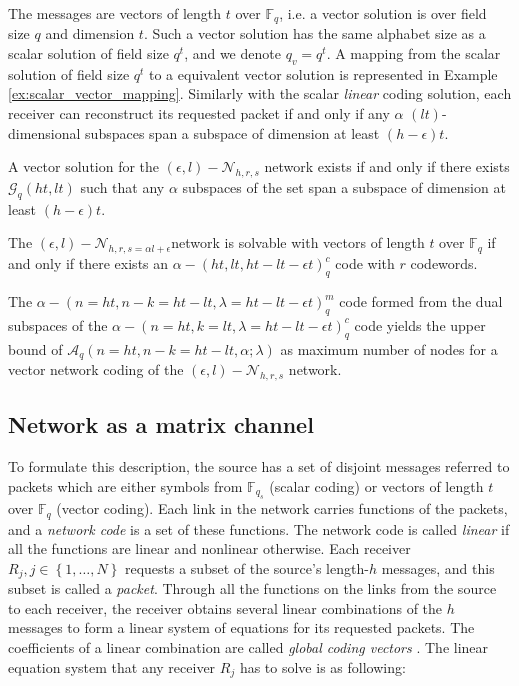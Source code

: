 The messages are vectors of length $t$ over $\ensuremath{\mathbb{F}}_{q}$,
i.e. a vector solution is over field size $q$ and dimension $t$.
Such a vector solution has the same alphabet size as a scalar solution
of field size $q^{t}$, and we denote $q_{v}=q^{t}$. A mapping from
the scalar solution of field size $q^{t}$ to a equivalent vector
solution is represented in Example \ref{ex:scalar_vector_mapping}.
Similarly with the scalar \textit{linear} coding solution, each receiver
can reconstruct its requested packet if and only if any $\alpha$
$\left(lt\right)$-dimensional subspaces span a subspace of dimension
at least $\left(h-\epsilon\right)t$.
\begin{thm}
A vector solution for the $(\epsilon,l)-\mathcal{N}_{h,r,s}$ network
exists if and only if there exists $\mathcal{G}_{q}\left(ht,lt\right)$
such that any $\alpha$ subspaces of the set span a subspace of dimension
at least $\left(h-\epsilon\right)t$. \cite{Zhang:2019}
\end{thm}
%
\begin{thm}
The $(\epsilon,l)-\mathcal{N}_{h,r,s=\alpha l+\epsilon}$network is
solvable with vectors of length $t$ over $\ensuremath{\mathbb{F}}_{q}$
if and only if there exists an $\alpha-\left(ht,lt,ht-lt-\epsilon t\right)_{q}^{c}$
code with $r$ codewords. \cite{Zhang:2019}
\end{thm}
\begin{cor}
The $\alpha-\left(n=ht,n-k=ht-lt,\lambda=ht-lt-\epsilon t\right)_{q}^{m}$
code formed from the dual subspaces of the $\alpha-\left(n=ht,k=lt,\lambda=ht-lt-\epsilon t\right)_{q}^{c}$
code yields the upper bound of $\mathcal{A}_{q}\left(n=ht,n-k=ht-lt,\alpha;\lambda\right)$
as maximum number of nodes for a vector network coding of the $(\epsilon,l)-\mathcal{N}_{h,r,s}$
network. \label{cor:dual_subspaces}
\end{cor}

\subsection{Network as a matrix channel \label{subsec:Matrix-channel}}

To formulate this description, the source has a set of disjoint messages
referred to packets which are either symbols from $\ensuremath{\mathbb{F}}_{q_{s}}$
(scalar coding) or vectors of length $t$ over $\ensuremath{\mathbb{F}}_{q}$
(vector coding). Each link in the network carries functions of the
packets, and a \textit{network code} is a set of these functions.
The network code is called \textit{linear} if all the functions are
linear and nonlinear otherwise. Each receiver $R_{j},j\in\left\{ 1,\ldots,N\right\} $
requests a subset of the source's length-$h$ messages, and this subset
is called a \textit{packet}. Through all the functions on the links
from the source to each receiver, the receiver obtains several linear
combinations of the $h$ messages to form a linear system of equations
for its requested packets. The coefficients of a linear combination
are called \textit{global coding vectors} \cite{Sanders:2003}. The
linear equation system that any receiver $R_{j}$ has to solve is
as following:

